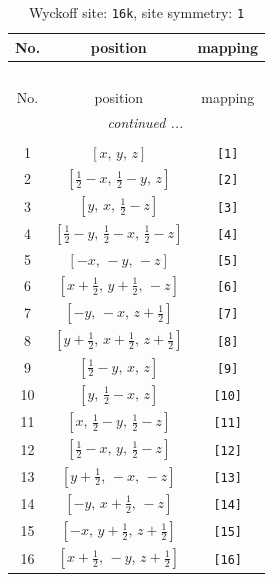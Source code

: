 \documentclass[fleqn,8pt]{jsarticle}
\begin{document}
\begin{longtable}{ccc}
\caption{Wyckoff site: {\tt 16k}, site symmetry: {\tt 1}}
 \\
 \hline \hline
No. & position & mapping \\ \hline \endfirsthead

\multicolumn{2}{l}{\tablename\ \thetable{}} \\
 \hline \hline
No. & position & mapping \\ \hline \endhead

 \hline \hline
\multicolumn{2}{r}{\footnotesize\it continued ...} \\ \endfoot

 \hline \hline
\multicolumn{2}{r}{} \\ \endlastfoot

1 & $\left[ x,\, y,\, z \right]$ & {\tt [1]} \\ \hline
2 & $\left[ \frac{1}{2} - x,\, \frac{1}{2} - y,\, z \right]$ & {\tt [2]} \\ \hline
3 & $\left[ y,\, x,\, \frac{1}{2} - z \right]$ & {\tt [3]} \\ \hline
4 & $\left[ \frac{1}{2} - y,\, \frac{1}{2} - x,\, \frac{1}{2} - z \right]$ & {\tt [4]} \\ \hline
5 & $\left[ - x,\, - y,\, - z \right]$ & {\tt [5]} \\ \hline
6 & $\left[ x + \frac{1}{2},\, y + \frac{1}{2},\, - z \right]$ & {\tt [6]} \\ \hline
7 & $\left[ - y,\, - x,\, z + \frac{1}{2} \right]$ & {\tt [7]} \\ \hline
8 & $\left[ y + \frac{1}{2},\, x + \frac{1}{2},\, z + \frac{1}{2} \right]$ & {\tt [8]} \\ \hline
9 & $\left[ \frac{1}{2} - y,\, x,\, z \right]$ & {\tt [9]} \\ \hline
10 & $\left[ y,\, \frac{1}{2} - x,\, z \right]$ & {\tt [10]} \\ \hline
11 & $\left[ x,\, \frac{1}{2} - y,\, \frac{1}{2} - z \right]$ & {\tt [11]} \\ \hline
12 & $\left[ \frac{1}{2} - x,\, y,\, \frac{1}{2} - z \right]$ & {\tt [12]} \\ \hline
13 & $\left[ y + \frac{1}{2},\, - x,\, - z \right]$ & {\tt [13]} \\ \hline
14 & $\left[ - y,\, x + \frac{1}{2},\, - z \right]$ & {\tt [14]} \\ \hline
15 & $\left[ - x,\, y + \frac{1}{2},\, z + \frac{1}{2} \right]$ & {\tt [15]} \\ \hline
16 & $\left[ x + \frac{1}{2},\, - y,\, z + \frac{1}{2} \right]$ & {\tt [16]} \\
\end{longtable}
\end{document}
